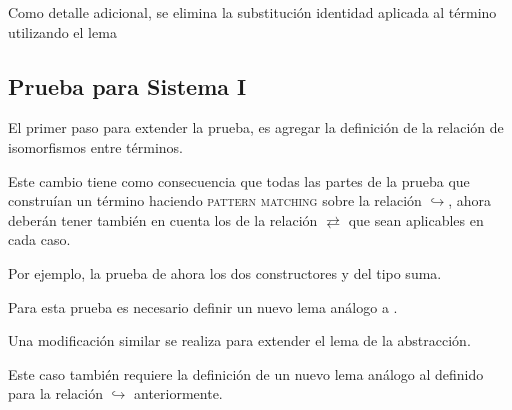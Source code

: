 \documentclass[]{report}
\begin{document}
	Como detalle adicional, se elimina la substitución identidad aplicada al término utilizando el lema
	\AgdaSpace{}%
	\AgdaSymbol{:}\AgdaSpace{}%
	\AgdaSpace{}%
	\AgdaSymbol{\}}\AgdaSpace{}%
	\AgdaSymbol{\{}\AgdaSpace{}%
	\AgdaSymbol{:}\AgdaSpace{}%
	\AgdaSpace{}%
	\AgdaSpace{}%
	\AgdaSymbol{\}}\AgdaSpace{}%
	\AgdaSpace{}%
	\AgdaSpace{}%
	\AgdaSpace{}%
	\AgdaSpace{}%
	\AgdaSpace{}%
	\AgdaSpace{}%
	


	\subsection{Prueba para Sistema I}
	
	El primer paso para extender la prueba, es agregar la definición de  la relación de isomorfismos entre términos.
	
	
	Este cambio tiene como consecuencia que todas las partes de la prueba que construían un término \snstar haciendo \textsc{pattern matching} sobre la relación $\hookrightarrow$, ahora deberán tener también en cuenta los de la relación $\rightleftarrows$ que sean aplicables en cada caso.
	
	Por ejemplo, la prueba de  ahora los dos constructores  y  del tipo suma.
	
	
	Para esta prueba es necesario definir un nuevo lema análogo a .
	
	
	Una modificación similar se realiza para extender el lema de la abstracción.
	
	
	Este caso también requiere la definición de un nuevo lema análogo al definido para la relación $\hookrightarrow$ anteriormente.
	
\end{document}
